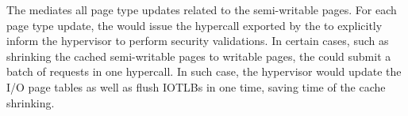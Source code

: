 The \cache mediates all page type updates related to the semi-writable pages.
For each page type update, the \cache would issue the hypercall exported by the \module to explicitly inform the hypervisor to perform security validations.
In certain cases, such as shrinking the cached semi-writable pages to writable pages, the \cache could submit a batch of requests in one hypercall.
In such case, the hypervisor would update the I/O page tables as well as flush IOTLBs in one time, saving time of the cache shrinking.







